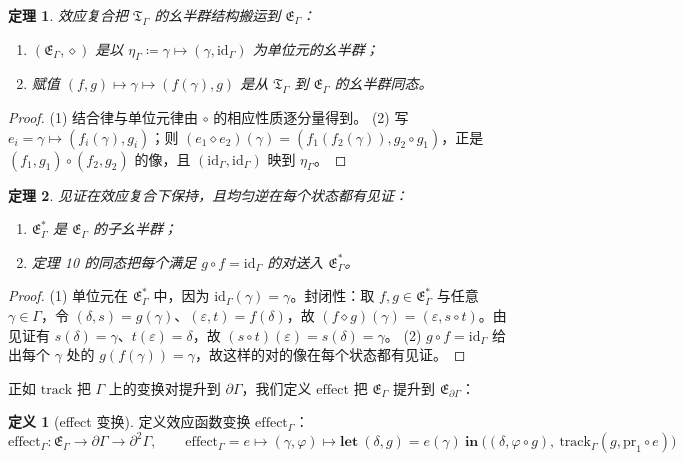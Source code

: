 \documentclass[11pt,a4paper]{article}
\theoremstyle{plain}
\newtheorem{theorem}{定理}
\theoremstyle{definition}
\newtheorem{definition}{定义}
\theoremstyle{remark}
\begin{document}
\begin{theorem}\label{thm:effcomp-monoid}
效应复合把 $\mathfrak{T}_\Gamma$ 的幺半群结构搬运到 $\mathfrak{E}_\Gamma$：
\begin{enumerate}
\item $(\mathfrak{E}_\Gamma, \diamond)$ 是以 $\eta_\Gamma \coloneqq \gamma \mapsto (\gamma, \mathrm{id}_\Gamma)$ 为单位元的幺半群；
\item 赋值 $(f, g) \mapsto \gamma \mapsto (f(\gamma), g)$ 是从 $\mathfrak{T}_\Gamma$ 到 $\mathfrak{E}_\Gamma$ 的幺半群同态。
\end{enumerate}
\end{theorem}

\begin{proof}
(1) 结合律与单位元律由 $\circ$ 的相应性质逐分量得到。
(2) 写 $e_i = \gamma \mapsto (f_i(\gamma), g_i)$；则 $(e_1 \diamond e_2)(\gamma) = (f_1(f_2(\gamma)), g_2 \circ g_1)$，正是 $(f_1, g_1) \circ (f_2, g_2)$ 的像，且 $(\mathrm{id}_\Gamma, \mathrm{id}_\Gamma)$ 映到 $\eta_\Gamma$。
\end{proof}

\begin{theorem}\label{thm:witness-submonoid}
见证在效应复合下保持，且均匀逆在每个状态都有见证：
\begin{enumerate}
\item $\mathfrak{E}_\Gamma^\ast$ 是 $\mathfrak{E}_\Gamma$ 的子幺半群；
\item 定理 10 的同态把每个满足 $g \circ f = \mathrm{id}_\Gamma$ 的对送入 $\mathfrak{E}_\Gamma^\ast$。
\end{enumerate}
\end{theorem}

\begin{proof}
(1) 单位元在 $\mathfrak{E}_\Gamma^\ast$ 中，因为 $\mathrm{id}_\Gamma(\gamma) = \gamma$。封闭性：取 $f, g \in \mathfrak{E}_\Gamma^\ast$ 与任意 $\gamma \in \Gamma$，令 $(\delta, s) = g(\gamma)$、$(\varepsilon, t) = f(\delta)$，故 $(f \diamond g)(\gamma) = (\varepsilon, s \circ t)$。由见证有 $s(\delta) = \gamma$、$t(\varepsilon) = \delta$，故 $(s \circ t)(\varepsilon) = s(\delta) = \gamma$。
(2) $g \circ f = \mathrm{id}_\Gamma$ 给出每个 $\gamma$ 处的 $g(f(\gamma)) = \gamma$，故这样的对的像在每个状态都有见证。
\end{proof}

正如 $\mathrm{track}$ 把 $\Gamma$ 上的变换对提升到 $\partial\Gamma$，我们定义 $\mathrm{effect}$ 把 $\mathfrak{E}_\Gamma$ 提升到 $\mathfrak{E}_{\partial\Gamma}$：

\begin{definition}[effect 变换]
定义效应函数变换 $\mathrm{effect}_\Gamma$：
\[
\mathrm{effect}_\Gamma : \mathfrak{E}_\Gamma \to \partial\Gamma \to \partial^2\Gamma, \qquad
\mathrm{effect}_\Gamma = e \mapsto (\gamma, \varphi) \mapsto \mathbf{let}\ (\delta, g) = e(\gamma)\ \mathbf{in}\ \big((\delta, \varphi \circ g),\ \mathrm{track}_\Gamma(g, \mathrm{pr}_1 \circ e)\big) \tag{14}
\]
\end{definition}
\end{document}

